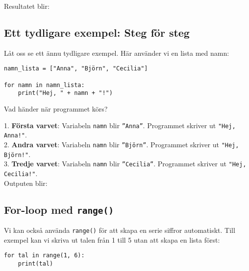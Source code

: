 Resultatet blir:



\subsection{Ett tydligare exempel: Steg för steg}

Låt oss se ett ännu tydligare exempel. Här använder vi en lista med namn:

\begin{lstlisting}[title=Exempel: Skriv ut namn]
namn_lista = ["Anna", "Björn", "Cecilia"]

for namn in namn_lista:
    print("Hej, " + namn + "!")
\end{lstlisting}

Vad händer när programmet körs?

1. \textbf{Första varvet}: Variabeln \texttt{namn} blir \texttt{''Anna''}. Programmet skriver ut \texttt{"Hej, Anna!"}.\\
2. \textbf{Andra varvet}: Variabeln \texttt{namn} blir \texttt{''Björn''}. Programmet skriver ut \texttt{"Hej, Björn!"}.\\
3. \textbf{Tredje varvet}: Variabeln \texttt{namn} blir \texttt{''Cecilia''}. Programmet skriver ut \texttt{"Hej, Cecilia!"}.\\

Outputen blir:



\subsection{For-loop med \texttt{range()}}
Vi kan också använda \texttt{range()} för att skapa en serie siffror automatiskt. Till exempel kan vi skriva ut talen från 1 till 5 utan att skapa en lista först:

\begin{lstlisting}[title=Exempel: range()]
for tal in range(1, 6):
    print(tal)
\end{lstlisting}

